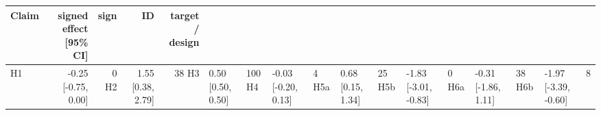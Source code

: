 \begin{tabular}{lrrrr}
\toprule
Claim & signed effect [95\% CI] & sign & ID & target / design \\
\midrule
H1 & -0.25 [-0.75, 0.00] & 0%
H2 & 1.55 [0.38, 2.79] & 38%
H3 & 0.50 [0.50, 0.50] & 100%
H4 & -0.03 [-0.20, 0.13] & 4%
H5a & 0.68 [0.15, 1.34] & 25%
H5b & -1.83 [-3.01, -0.83] & 0%
H6a & -0.31 [-1.86, 1.11] & 38%
H6b & -1.97 [-3.39, -0.60] & 8%
\bottomrule
\end{tabular}